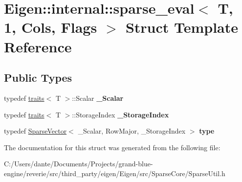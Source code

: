 \hypertarget{struct_eigen_1_1internal_1_1sparse__eval_3_01_t_00_011_00_01_cols_00_01_flags_01_4}{}\section{Eigen\+::internal\+::sparse\+\_\+eval$<$ T, 1, Cols, Flags $>$ Struct Template Reference}
\label{struct_eigen_1_1internal_1_1sparse__eval_3_01_t_00_011_00_01_cols_00_01_flags_01_4}
\subsection*{Public Types}
\begin{DoxyCompactItemize}
\item 
\mbox{\label{struct_eigen_1_1internal_1_1sparse__eval_3_01_t_00_011_00_01_cols_00_01_flags_01_4_ae20e9d4371cac378f9de6fe9c384e9c1}} 
typedef \mbox{\hyperlink{struct_eigen_1_1internal_1_1traits}{traits}}$<$ T $>$\+::Scalar {\bfseries \+\_\+\+Scalar}
\item 
\mbox{\label{struct_eigen_1_1internal_1_1sparse__eval_3_01_t_00_011_00_01_cols_00_01_flags_01_4_ae04531ef2d607818bf5fc2797943da5b}} 
typedef \mbox{\hyperlink{struct_eigen_1_1internal_1_1traits}{traits}}$<$ T $>$\+::Storage\+Index {\bfseries \+\_\+\+Storage\+Index}
\item 
\mbox{\label{struct_eigen_1_1internal_1_1sparse__eval_3_01_t_00_011_00_01_cols_00_01_flags_01_4_a4652d925d593f6f613d6e43197f33c42}} 
typedef \mbox{\hyperlink{class_eigen_1_1_sparse_vector}{Sparse\+Vector}}$<$ \+\_\+\+Scalar, Row\+Major, \+\_\+\+Storage\+Index $>$ {\bfseries type}
\end{DoxyCompactItemize}


The documentation for this struct was generated from the following file\+:\begin{DoxyCompactItemize}
\item 
C\+:/\+Users/dante/\+Documents/\+Projects/grand-\/blue-\/engine/reverie/src/third\+\_\+party/eigen/\+Eigen/src/\+Sparse\+Core/Sparse\+Util.\+h\end{DoxyCompactItemize}
